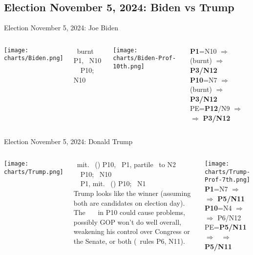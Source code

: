 \subsection{Election November 5, 2024: Biden vs Trump}
\begin{frame}[t]{Election November 5, 2024: Joe Biden}
\small

\begin{columns}[T, onlytextwidth]
\vspace{-1em}
{\texttt{[image: charts/Biden.png]}}
\fontsize{7pt}{8pt}\selectfont

\Mercury\, burnt \Sextile\, P1, \Sextile\, N10 \\
\Sun\, \Sextile\, P10; \Sextile\, N10

\vspace{-1em}
{\texttt{[image: charts/Biden-Prof-10th.png]}}
\fontsize{8pt}{9pt}\selectfont

\textbf{\dgreen P1}=N10
	$\Rightarrow$ \Mercury\, (burnt) $\Rightarrow$ \textbf{\dgreen P3/N12}\\
\textbf{\red P10}=N7
	$\Rightarrow$ \Mercury\, (burnt) $\Rightarrow$ \textbf{\dgreen P3/N12}\\
PE=\textbf{\dgreen P12}/N9
	 $\Rightarrow$ \Sun\, $\Rightarrow$ \textbf{\dgreen P3/N12}

\end{columns}
\end{frame}

\begin{frame}[t]{Election November 5, 2024: Donald Trump}
\small
\begin{columns}[T, onlytextwidth]
\vspace{-1em}
{\texttt{[image: charts/Trump.png]}}
\fontsize{6pt}{7pt}\selectfont

\Saturn\, mit. \Quincunx\, (\Opposition) P10, \Trine\, P1, partile \Sextile\, to N2 \\
\Mars\, \Trine\, P10; \Square\, N10 \\
\Mercury\, \Trine\, P1, mit. \Quincunx\, (\Opposition) P10; \Sextile\, N1 \\
\vspace{0.5em}
Trump looks like the winner (assuming both are candidates on election day). The \SouthNode\, \Conjunction\, \Moon\, in P10 could cause problems, possibly GOP won't do well overall, weakening his control over Congress or the Senate, or both (\Moon\, rules P6, N11).

\vspace{-1em}
{\texttt{[image: charts/Trump-Prof-7th.png]}}
\fontsize{8pt}{9pt}\selectfont
\textbf{\dgreen P1}=N7
	$\Rightarrow$ \Saturn\, $\Rightarrow$ \textbf{\dgreen P5/N11}\\
\textbf{\red P10}=N4
	$\Rightarrow$ \Mars\, $\Rightarrow$ P6/N12\\
PE=\textbf{\dgreen P5/N11}
	 $\Rightarrow$ \Mercury\, $\Rightarrow$ \textbf{\dgreen P5/N11}

\end{columns}
\end{frame}
